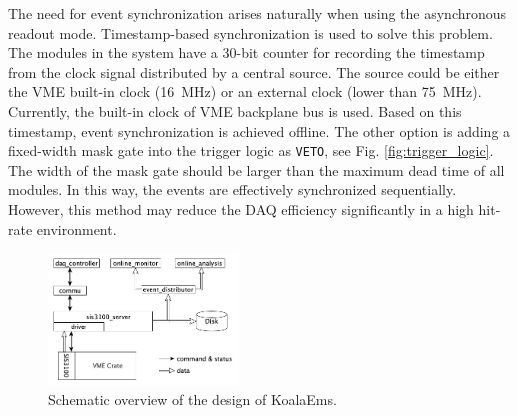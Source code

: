 \documentclass[number,5p]{elsarticle}
\begin{document}
The need for event synchronization arises naturally when using the asynchronous
readout mode.
Timestamp-based synchronization is used to solve this problem.
The modules in the system have a 30-bit counter for recording the timestamp from
the clock signal distributed by a central source.
The source could be either the VME built-in clock (\SI{16}{\MHz}) or an external clock
(lower than \SI{75}{\MHz}).
Currently, the built-in clock of VME backplane bus is used. 
Based on this timestamp, event synchronization is achieved offline.
The other option is adding a fixed-width mask gate into the trigger logic as \texttt{VETO}, see Fig. \ref{fig:trigger_logic}.
The width of the mask gate should be larger than the maximum dead time of all modules.
In this way, the events are effectively synchronized sequentially. 
However, this method may reduce the DAQ efficiency significantly in a high hit-rate environment.

\begin{figure}[htbp]
\centering
\includegraphics[width=0.45\textwidth]{./koalaems_deployment.png}
\caption{Schematic overview of the design of KoalaEms.}
\label{fig:koalaems}
\end{figure}
\end{document}
